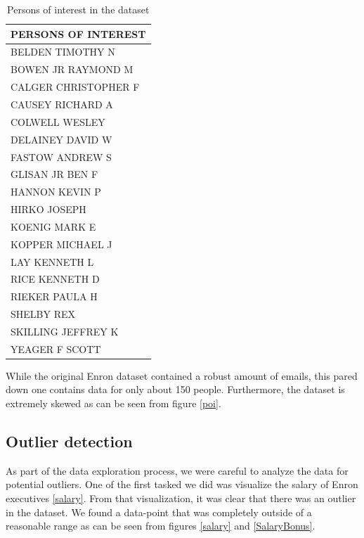 \documentclass[twoside,openright,titlepage,numbers=noenddot,headinclude,%
               footinclude=true,cleardoublepage=empty,abstractoff,BCOR=5mm,%
               paper=a4,fontsize=11pt,ngerman,american]{scrreprt}
\numberwithin{theorem}{chapter}
\numberwithin{definition}{chapter}
\numberwithin{algorithm}{chapter}
\numberwithin{figure}{chapter}
\numberwithin{table}{chapter}
\numberwithin{equation}{chapter}
\begin{document}
\begin{table}[!htbp]
  \begin{center}
    \begin{tabular}{ |p{8cm}| } 
    \hline
    PERSONS OF INTEREST                \\ 

    \hline
    BELDEN TIMOTHY N    \\ 
    BOWEN JR RAYMOND M  \\ 
    CALGER CHRISTOPHER F\\ 
    CAUSEY RICHARD A    \\ 
    COLWELL WESLEY      \\ 
    DELAINEY DAVID W    \\ 
    FASTOW ANDREW S     \\ 
    GLISAN JR BEN F     \\ 
    HANNON KEVIN P      \\ 
    HIRKO JOSEPH        \\ 
    KOENIG MARK E       \\ 
    KOPPER MICHAEL J    \\ 
    LAY KENNETH L       \\ 
    RICE KENNETH D      \\ 
    RIEKER PAULA H      \\ 
    SHELBY REX          \\ 
    SKILLING JEFFREY K  \\ 
    YEAGER F SCOTT      \\ 
    \hline
    \end{tabular}
    \caption{Persons of interest in the dataset}
    \label{poiTable}
  \end{center}
\end{table}
While the original Enron dataset contained a robust amount of emails, this pared down one contains data for only about 150 people. Furthermore, the dataset is extremely skewed as can be seen from figure \ref{poi}.

\clearpage


\subsection*{Outlier detection}
 As part of the data exploration process, we were careful to analyze the data for potential outliers. One of the first tasked we did was visualize the salary of Enron executives \ref{salary}. From that visualization, it was clear that there was an outlier in the dataset. We found a data-point that was completely outside of a reasonable range as can be seen from figures \ref{salary} and \ref{SalaryBonus}. 
\end{document}
